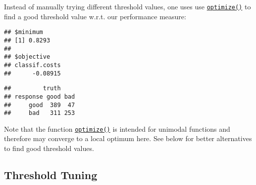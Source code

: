 \documentclass[
]{scrbook}
\newenvironment{Shaded}{\begin{snugshade}}{\end{snugshade}}
\newcommand{\CommentTok}[1]{\textcolor[rgb]{0.56,0.35,0.01}{\textit{#1}}}
\newcommand{\ControlFlowTok}[1]{\textcolor[rgb]{0.13,0.29,0.53}{\textbf{#1}}}
\newcommand{\DecValTok}[1]{\textcolor[rgb]{0.00,0.00,0.81}{#1}}
\newcommand{\FloatTok}[1]{\textcolor[rgb]{0.00,0.00,0.81}{#1}}
\newcommand{\FunctionTok}[1]{\textcolor[rgb]{0.00,0.00,0.00}{#1}}
\newcommand{\NormalTok}[1]{#1}
\newcommand{\OtherTok}[1]{\textcolor[rgb]{0.56,0.35,0.01}{#1}}
\newcommand{\SpecialCharTok}[1]{\textcolor[rgb]{0.00,0.00,0.00}{#1}}
\renewenvironment{Shaded} {\begin{snugshade}\small} {\end{snugshade}}
\begin{document}
Instead of manually trying different threshold values, one uses use \href{https://www.rdocumentation.org/packages/stats/topics/optimize}{\texttt{optimize()}} to find a good threshold value w.r.t. our performance measure:

\begin{Shaded}
\end{Shaded}

\begin{verbatim}
## $minimum
## [1] 0.8293
## 
## $objective
## classif.costs 
##      -0.08915
\end{verbatim}

\begin{Shaded}
\end{Shaded}

\begin{verbatim}
##         truth
## response good bad
##     good  389  47
##     bad   311 253
\end{verbatim}

Note that the function \href{https://www.rdocumentation.org/packages/stats/topics/optimize}{\texttt{optimize()}} is intended for unimodal functions and therefore may converge to a local optimum here.
See below for better alternatives to find good threshold values.

\hypertarget{threshold-tuning}{%
\subsection{Threshold Tuning}\label{threshold-tuning}}
\end{document}

